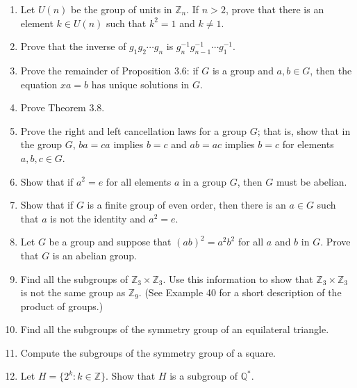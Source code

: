 \documentclass[12pt,reqno]{amsart}
\begin{document}
\begin{enumerate}[{\bf 1.}]
 
\item
Let $U(n)$ be the group of units in ${\mathbb Z}_n$. If $n > 2$, prove that
there is an element $k \in U(n)$ such that $k^2 = 1$ and $k \neq 1$.
 
 
\item
Prove that the inverse of $g _1 g_2 \cdots g_n$ is $g_n^{-1}
g_{n-1}^{-1} \cdots g_1^{-1}$. 
 
 
\item
Prove the remainder of Proposition 3.6: if $G$ is a group and $a, b \in G$, then
the equation $xa = b$ has unique solutions in $G$. 
 
\item
Prove Theorem 3.8.
 
 
\item
Prove the right and left cancellation laws for a group $G$; that is,
show that in the group $G$, $ba = ca$ implies $b = c$ and $ab = ac$
implies $b = c$ for elements $a, b, c \in G$.  
 
\item
Show that if $a^2 = e$ for all elements $a$ in a group $G$, then $G$ must be abelian. 
 
 
\item
Show that if $G$ is a finite group of even order, then there is an $a
\in G$ such that $a$ is not the identity and $a^2 = e$.
 
 
\item
Let $G$ be a group and suppose that $(ab)^2 = a^2b^2$ for all $a$ and
$b$ in $G$.  Prove that $G$ is an abelian group. 
 
 
\item
Find all the subgroups of ${\mathbb Z}_3 \times {\mathbb Z}_3$. Use this
information to show that ${\mathbb Z}_3 \times {\mathbb Z}_3$ is not the
same group as ${\mathbb Z}_9$.  (See Example 40
for a short description of the product of groups.)
 
 
\item
Find all the subgroups of the symmetry group of an equilateral
triangle. 
 
 
\item
Compute the subgroups of the symmetry group of a square.
 
 
\item
Let $H = \{2^k : k \in {\mathbb Z} \}$. Show that $H$ is a subgroup of
${\mathbb Q}^*$. 
 

\end{enumerate}
\end{document}
